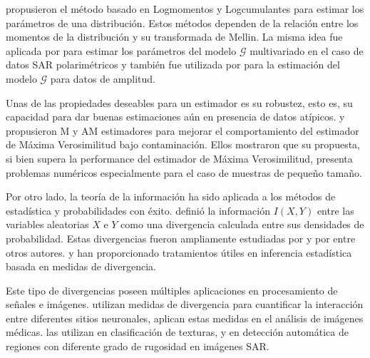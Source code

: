  \citet{nicolas2002} propusieron el método basado en Logmomentos y Logcumulantes para estimar los parámetros de una distribución. Estos métodos dependen de la relación entre los momentos de la distribución y su transformada de Mellin. La misma idea fue aplicada por \citet{khan2014} para estimar los parámetros del modelo $\mathcal{G}$ multivariado en el caso de datos SAR polarimétricos y también fue utilizada por \citet{Tison2004} para la estimación del modelo $\mathcal{G}$ para datos de amplitud.

Unas de las propiedades deseables para un estimador es su robustez, esto es, su capacidad para dar buenas estimaciones aún en presencia de datos atípicos. \citet{BustosFreryLucini:Mestimators:2001} y \citet{AllendeFreryetal:JSCS:05} propusieron M y AM estimadores para mejorar el comportamiento del estimador de Máxima Verosimilitud bajo contaminación. Ellos mostraron que su propuesta, si bien supera la performance del estimador de Máxima Verosimilitud, presenta problemas numéricos especialmente para el caso de muestras de pequeño tamaño.

Por otro lado, la teoría de la información ha sido aplicada a los métodos de estadística y probabilidades con éxito. \citet{Shannon1948} definió la información $I(X,Y)$ entre las variables aleatorias $X$ e $Y$ como una divergencia calculada entre sus densidades de probabilidad. 
Estas divergencias fueron ampliamente estudiadas por \citet{KullbackLeibler1951} y por \citet{renyi1961} entre otros autores. \citet{pardo2005statistical} y \citet{Basu2011} han proporcionado tratamientos útiles en inferencia estadística basada en medidas de divergencia.

Este tipo de divergencias poseen múltiples aplicaciones en procesamiento de señales e imágenes. \citet{Aviyente2007} utilizan medidas de divergencia para cuantificar la interacción entre diferentes sitios neuronales, \citet{5599869} aplican estas medidas en el análisis de imágenes médicas.
\citet{1246862} las utilizan en clasificación de texturas, \citet{6377288} y \citet{ClassificationPolSARSegmentsMinimizationWishartDistances} en detección automática de regiones con diferente grado de rugosidad en imágenes SAR.


